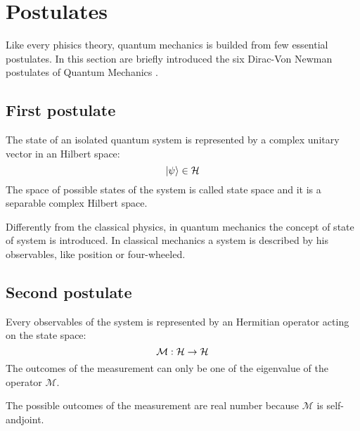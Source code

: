 \section{Postulates}
    Like every phisics theory, quantum mechanics is builded from few 
    essential postulates.
    In this section are briefly introduced the six Dirac-Von Newman 
    postulates of Quantum Mechanics \cite{quantumMec_Dirac,quantumMec_Neumann}.
    
    \subsection{First postulate}
    \begin{postulate}
        The state of an isolated quantum system is represented by a complex unitary 
        vector in an Hilbert space:
        \begin{equation*}
            \ket{\psi} \in \mathcal{H}
        \end{equation*}
        The space of possible states of the system is called state space and it is a
        separable complex Hilbert space.
        \label{post:1}
    \end{postulate}
    \begin{observation*}
        Differently from the classical physics, in quantum mechanics the concept
        of state of system is introduced. In classical mechanics a system is 
        described by his observables, like position or four-wheeled.
    \end{observation*}
    
    \subsection{Second postulate}
    \begin{postulate}[Observables]
        Every observables of the system is represented by an Hermitian operator
        acting on the state space:
        \begin{equation*}
            \mathcal{M}:\mathcal{H}\to\mathcal{H}
        \end{equation*}
        The outcomes of the measurement can only be one of the eigenvalue of the 
        operator $\mathcal{M}$.
        \label{post:2}
    \end{postulate}
    \begin{observation*}
        The possible outcomes of the measurement are real number because $\mathcal{M}$
        is self-andjoint. 
    \end{observation*}

